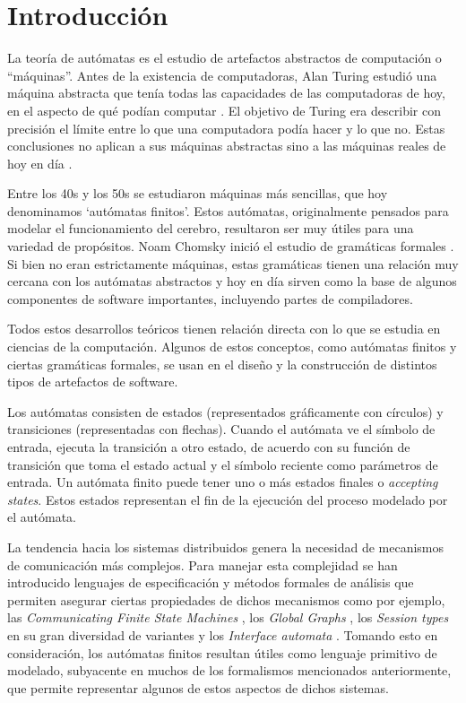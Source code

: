 \section{Introducción}
La teoría de autómatas es el estudio de artefactos abstractos de computación o ``máquinas''. Antes de la existencia de computadoras, Alan Turing estudió una máquina abstracta que tenía todas las capacidades de las computadoras de hoy, en el aspecto de qué podían computar \cite{turing:plms-s2-42_1,turing:plms-s2-43_1}. El objetivo de Turing era describir con precisión el límite entre lo que una computadora podía hacer y lo que no. Estas conclusiones no aplican a sus máquinas abstractas sino a las máquinas reales de hoy en día \cite{ullman}.

Entre los 40s y los 50s se estudiaron máquinas más sencillas, que hoy denominamos `autómatas finitos'. Estos autómatas, originalmente pensados para modelar el funcionamiento del cerebro, resultaron ser muy útiles para una variedad de propósitos. Noam Chomsky inició el estudio de gramáticas formales \cite{chomsky:iretit-2_3}. Si bien no eran estrictamente máquinas, estas gramáticas tienen una relación muy cercana con los autómatas abstractos y hoy en día sirven como la base de algunos componentes de software importantes, incluyendo partes de compiladores.

Todos estos desarrollos teóricos tienen relación directa con lo que se estudia en ciencias de la computación. Algunos de estos conceptos, como autómatas finitos y ciertas gramáticas formales, se usan en el diseño y la construcción de distintos tipos de artefactos de software.

Los autómatas consisten de estados (representados gráficamente con círculos) y transiciones (representadas con flechas). Cuando el autómata ve el símbolo de entrada, ejecuta la transición a otro estado, de acuerdo con su función de transición que toma el estado actual y el símbolo reciente como parámetros de entrada. Un autómata finito puede tener uno o más estados finales o \emph{accepting states}. Estos estados representan el fin de la ejecución del proceso modelado por el autómata.

La tendencia hacia los sistemas distribuidos genera la necesidad de mecanismos de comunicación más complejos. Para manejar esta complejidad se han introducido lenguajes de especificación y métodos formales de análisis que permiten asegurar ciertas propiedades de dichos mecanismos como por ejemplo, las \emph{Communicating Finite State Machines} \cite{brand:jacm-30_2}, los \emph{Global Graphs} \cite{castagna:lmcs-8_1}, los \emph{Session types} en su gran diversidad de variantes \cite{honda:esop98,honda:popl08} y los \emph{Interface automata} \cite{dealfaro:esec-fse-01}. Tomando esto en consideración, los autómatas finitos resultan útiles como lenguaje primitivo de modelado, subyacente en muchos de los formalismos mencionados anteriormente, que permite representar algunos de estos aspectos de dichos sistemas.

